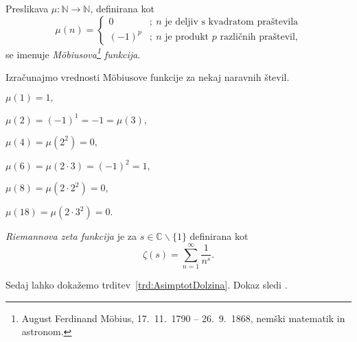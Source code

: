 \documentclass[mat1]{fmfdelo}
\begin{document}
\begin{definicija}
\label{def:MobFun}
Preslikava \( \mu\colon \mathbb{N} \to \mathbb{N} \), definirana kot
\[
\mu(n) = \left\{
\begin{array}{rl}
0 & ;\ \mbox{$n$ je deljiv s kvadratom praštevila}\\
(-1)^p & ;\  \mbox{$n$ je produkt $p$ različnih praštevil,}
\end{array}
\right.
\]
se imenuje \emph{M\"obiusova\footnote{August Ferdinand M\"obius, 17.\ 11.\ 1790 -- 26.\ 9.\ 1868, nemški matematik in astronom.} funkcija}.
\end{definicija}

\begin{primer}
Izračunajmo vrednosti M\"obiusove funkcije za nekaj naravnih števil.

\( \mu(1)=1, \)

\( \mu(2)=(-1)^{1}=-1=\mu(3), \)

\( \mu(4)=\mu(2^{2})=0, \)

\( \mu(6)=\mu(2\cdot3)=(-1)^{2}=1, \)

\( \mu(8)=\mu(2\cdot2^{2})=0, \)

\( \mu(18)=\mu(2\cdot3^{2})=0. \)
\end{primer}

\begin{definicija}
\label{def:RiemZeta}
\emph{Riemannova zeta funkcija} je za
 $s\in\mathbb{C}\backslash\{1\}$
definirana kot
\[ \zeta(s) = \sum_{n=1}^{\infty}\frac{1}{n^s}. \]
\end{definicija}

%
Sedaj lahko dokažemo trditev~\ref{trd:AsimptotDolzina}. Dokaz sledi \cite[poglavje 18.5, str.~268]{hardy}.
\end{document}
